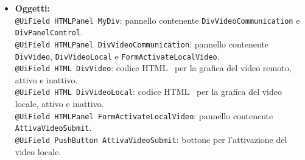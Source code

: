 {\begin{sloppypar}
{{\begin{itemize}
					\texttt{- RadioButton voto3}: radio button per assegnare un giudizio di 3.\\

					\texttt{- RadioButton voto4}: radio button per assegnare un giudizio di 4.\\

					\texttt{- RadioButton voto5}: radio button per assegnare un giudizio di 5.\\
					
					\texttt{- CellList<ContactInfo> cellList}: oggetto lista di celle contenente le informazioni dei contatti.\\

					\texttt{- CellList<MessageInfo> cellListMessage}: oggetto lista di celle contenente le informazioni dei messaggi.\\
					
					\texttt{- String selected}: stringa contenente lo username dell'utente attualmente selezionato, se nessun utente è selezionato \texttt{selected} risulta vuota.\\
					
					\texttt{- SingleSelectionModel<ContactInfo> selectionModel}: oggetto che indica l'elemento dei \texttt{ContactInfo} attualmente selezionato.\\
					
				\item[] \textbf{Oggetti:}\\
					\texttt{@UiField HTMLPanel MyDiv}: pannello contenente \texttt{DivVideoCommunication} e 
						\texttt{DivPanelControl}.\\

					\texttt{@UiField HTMLPanel DivVideoCommunication}: pannello contenente \texttt{DivVideo},
						   \texttt{DivVideoLocal} e \texttt{FormActivateLocalVideo}.\\

					\texttt{@UiField HTML DivVideo}: codice HTML\g~ per la grafica del video remoto, attivo 
						e inattivo.\\

					\texttt{@UiField HTML DivVideoLocal}: codice HTML\g~ per la grafica del video locale, 
						attivo e inattivo.\\
					
					\texttt{@UiField HTMLPanel FormActivateLocalVideo}: pannello contenente \texttt{AttivaVideoSubmit}.\\

					\texttt{@UiField PushButton AttivaVideoSubmit}: bottone per l'attivazione del video 
						locale.\\


\end{itemize}}}
\end{sloppypar}}
